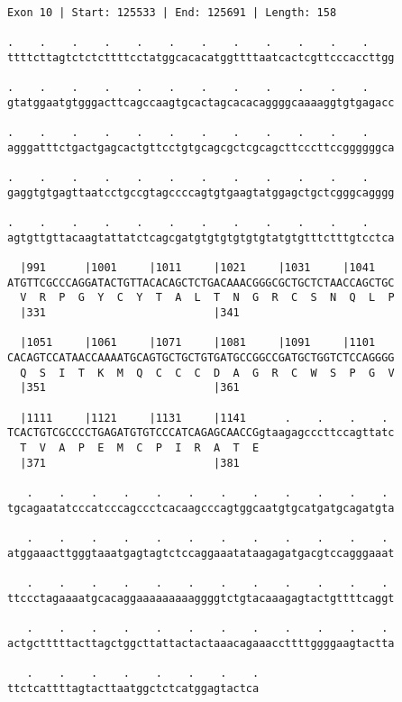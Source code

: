 \documentclass{article}
\begin{document}
\begin{Verbatim}
Exon 10 | Start: 125533 | End: 125691 | Length: 158
 
.    .    .    .    .    .    .    .    .    .    .    .    
ttttcttagtctctcttttcctatggcacacatggttttaatcactcgttcccaccttgg
  
.    .    .    .    .    .    .    .    .    .    .    .    
gtatggaatgtgggacttcagccaagtgcactagcacacaggggcaaaaggtgtgagacc
  
.    .    .    .    .    .    .    .    .    .    .    .    
agggatttctgactgagcactgttcctgtgcagcgctcgcagcttcccttccggggggca
  
.    .    .    .    .    .    .    .    .    .    .    .    
gaggtgtgagttaatcctgccgtagccccagtgtgaagtatggagctgctcgggcagggg
  
.    .    .    .    .    .    .    .    .    .    .    .    
agtgttgttacaagtattatctcagcgatgtgtgtgtgtgtatgtgtttctttgtcctca
  
  |991      |1001     |1011     |1021     |1031     |1041   
ATGTTCGCCCAGGATACTGTTACACAGCTCTGACAAACGGGCGCTGCTCTAACCAGCTGC
  V  R  P  G  Y  C  Y  T  A  L  T  N  G  R  C  S  N  Q  L  P
  |331                          |341                        
  
  |1051     |1061     |1071     |1081     |1091     |1101   
CACAGTCCATAACCAAAATGCAGTGCTGCTGTGATGCCGGCCGATGCTGGTCTCCAGGGG
  Q  S  I  T  K  M  Q  C  C  C  D  A  G  R  C  W  S  P  G  V
  |351                          |361                        
  
  |1111     |1121     |1131     |1141      .    .    .    . 
TCACTGTCGCCCCTGAGATGTGTCCCATCAGAGCAACCGgtaagagcccttccagttatc
  T  V  A  P  E  M  C  P  I  R  A  T  E                     
  |371                          |381                        
  
   .    .    .    .    .    .    .    .    .    .    .    . 
tgcagaatatcccatcccagccctcacaagcccagtggcaatgtgcatgatgcagatgta
  
   .    .    .    .    .    .    .    .    .    .    .    . 
atggaaacttgggtaaatgagtagtctccaggaaatataagagatgacgtccagggaaat
  
   .    .    .    .    .    .    .    .    .    .    .    . 
ttccctagaaaatgcacaggaaaaaaaaaggggtctgtacaaagagtactgttttcaggt
  
   .    .    .    .    .    .    .    .    .    .    .    . 
actgctttttacttagctggcttattactactaaacagaaaccttttggggaagtactta
  
   .    .    .    .    .    .    .    .
ttctcattttagtacttaatggctctcatggagtactca
\end{Verbatim}
\end{document}
